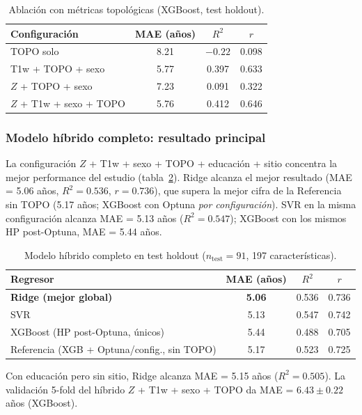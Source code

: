 \documentclass[12pt,a4paper]{article}
\begin{document}
\begin{table}[H]
  \centering
  \caption{Ablación con métricas topológicas (XGBoost, test holdout).}
  \label{tab:topo_abl}
  \begin{tabular}{lccc}
    \toprule
    Configuración & MAE (años) & $R^2$ & $r$ \\
    \midrule
    TOPO solo & 8.21 & $-0.22$ & 0.098 \\
    T1w + TOPO + sexo & 5.77 & 0.397 & 0.633 \\
    $Z$ + TOPO + sexo & 7.23 & 0.091 & 0.322 \\
    $Z$ + T1w + sexo + TOPO & 5.76 & 0.412 & 0.646 \\
    \bottomrule
  \end{tabular}
\end{table}

\subsubsection{Modelo híbrido completo: resultado principal}

La configuración $Z$ + T1w + sexo + TOPO + educación + sitio concentra la mejor
performance del estudio (tabla~\ref{tab:modelo_full}). Ridge alcanza el mejor resultado
(MAE = 5.06 años, $R^2 = 0.536$, $r = 0.736$), que supera la mejor cifra de la
Referencia sin TOPO (5.17 años; XGBoost con Optuna \emph{por configuración}). SVR en la misma
configuración alcanza MAE = 5.13 años ($R^2 = 0.547$); XGBoost con los mismos HP post-Optuna,
MAE = 5.44 años.

\begin{table}[H]
  \centering
  \caption{Modelo híbrido completo en test holdout ($n_{\text{test}} = 91$, 197 características).}
  \label{tab:modelo_full}
  \begin{tabular}{lccc}
    \toprule
    Regresor & MAE (años) & $R^2$ & $r$ \\
    \midrule
    \textbf{Ridge (mejor global)} & \textbf{5.06} & 0.536 & 0.736 \\
    SVR & 5.13 & 0.547 & 0.742 \\
    XGBoost (HP post-Optuna, únicos) & 5.44 & 0.488 & 0.705 \\
    Referencia (XGB + Optuna/config., sin TOPO) & 5.17 & 0.523 & 0.725 \\
    \bottomrule
  \end{tabular}
\end{table}

Con educación pero sin sitio, Ridge alcanza MAE = 5.15 años ($R^2 = 0.505$). La validación
5-fold del híbrido $Z$ + T1w + sexo + TOPO da MAE = $6.43 \pm 0.22$ años (XGBoost).
\end{document}
